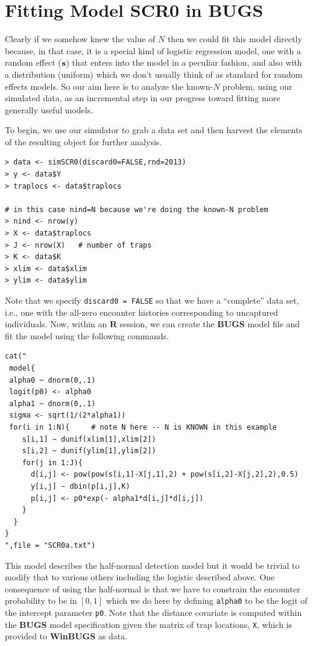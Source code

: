 \section{Fitting Model SCR0 in BUGS}
\label{scr0.sec.winbugs1}

Clearly if we somehow knew the value of $N$ then we could fit this
model directly because, in that case, it is a special kind of logistic
regression model, one with a random effect (${\bf s}$) that enters into the
model in a peculiar fashion, and also with a distribution (uniform)
which we don't usually think of as standard for random effects models.
So our aim here is to analyze the known-$N$ problem, using our
simulated data, as an incremental step in our progress toward fitting
more generally useful models.

To begin, we use our simulator to grab a data set and then harvest the
elements of the resulting object for further analysis.
\begin{verbatim}
> data <- simSCR0(discard0=FALSE,rnd=2013)
> y <- data$Y
> traplocs <- data$traplocs

# in this case nind=N because we're doing the known-N problem
> nind <- nrow(y)
> X <- data$traplocs
> J <- nrow(X)   # number of traps
> K <- data$K
> xlim <- data$xlim
> ylim <- data$ylim
\end{verbatim}

Note that we specify \mbox{\tt discard0 = FALSE} so that we have a
``complete'' data set, i.e., one with the all-zero encounter histories
corresponding to uncaptured individuals. Now, within an {\bf R} session, we
can create the {\bf BUGS} model file and fit the model using the following
commands.
{\small
\begin{verbatim}
cat("
 model{
 alpha0 ~ dnorm(0,.1)
 logit(p0) <- alpha0
 alpha1 ~ dnorm(0,.1)
 sigma <- sqrt(1/(2*alpha1))
 for(i in 1:N){     # note N here -- N is KNOWN in this example
    s[i,1] ~ dunif(xlim[1],xlim[2])
    s[i,2] ~ dunif(ylim[1],ylim[2])
    for(j in 1:J){
      d[i,j] <- pow(pow(s[i,1]-X[j,1],2) + pow(s[i,2]-X[j,2],2),0.5)
      y[i,j] ~ dbin(p[i,j],K)
      p[i,j] <- p0*exp(- alpha1*d[i,j]*d[i,j])
    }
  }
}
",file = "SCR0a.txt")
\end{verbatim}
}
This model describes the half-normal detection model but it
would be trivial to modify that to various others including the
logistic described above. One consequence of using the half-normal is
that we have to constrain the encounter probability to be in $[0,1]$
which we do here by defining \mbox{\tt alpha0} to be the logit of the
intercept parameter \mbox{\tt p0}. Note that the distance covariate is
computed within the {\bf BUGS} model specification given the matrix of trap
locations, \mbox{\tt X}, which is provided to {\bf WinBUGS} as data.

